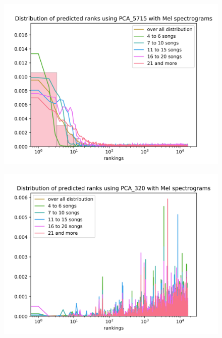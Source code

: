 \begin{figure}[h!]
\centering
\begin{minipage}{.5\textwidth}
  \centering
  \includegraphics[width=1\linewidth]{./img/pca_mel_5715_graph.png}
  \label{fig:pca_mel_5715_distribution}
\end{minipage}%
\begin{minipage}{.5\textwidth}
  \centering
  \includegraphics[width=1\linewidth]{./img/pca_mel_320_graph.png}
  \label{fig:pca_mel_320_distribution}
\end{minipage}
\end{figure}\label{fig:pca_mel_comparison_graps}

